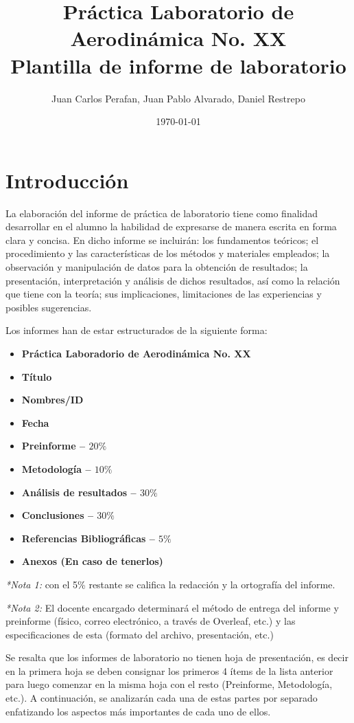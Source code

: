 \documentclass[a4paper]{article}
\title{Práctica Laboratorio de Aerodinámica No. XX \\
Plantilla de informe de laboratorio}
\author{Juan Carlos Perafan, Juan Pablo Alvarado, Daniel Restrepo}
\date{\today}
\begin{document}
\maketitle

\section{Introducción}

La elaboración del informe de práctica de laboratorio tiene como finalidad desarrollar en el alumno la habilidad de expresarse de manera escrita en forma clara y concisa. En dicho informe se incluirán: los fundamentos teóricos; el procedimiento y las características de los métodos y materiales empleados; la observación y manipulación de datos para la obtención de resultados; la presentación, interpretación y análisis de dichos resultados, así como la relación que tiene con la teoría; sus implicaciones, limitaciones de las experiencias y posibles sugerencias.

Los informes han de estar estructurados de la siguiente forma:

\begin{itemize}
\item \textbf{Práctica Laboradorio de Aerodinámica No. XX}
\item \textbf{Título}
\item \textbf{Nombres/ID}
\item \textbf{Fecha}
\item \textbf{Preinforme – $20\%$}
\item \textbf{Metodología – $10\%$}
\item \textbf{Análisis de resultados – $30\%$}
\item \textbf{Conclusiones – $30\%$}
\item \textbf{Referencias Bibliográficas – $5\%$}
\item \textbf{Anexos (En caso de tenerlos)}
\end{itemize}

\textit{*Nota 1:} con el 5\% restante se califica la redacción y la ortografía del informe.

\textit{*Nota 2:} El docente encargado determinará el método de entrega del informe y preinforme (físico, correo electrónico, a través de Overleaf, etc.) y las especificaciones de esta (formato del archivo, presentación, etc.)

Se resalta que los informes de laboratorio no tienen hoja de presentación, es decir en la primera hoja se deben consignar los primeros 4 ítems de la lista anterior para luego comenzar en la misma hoja con el resto (Preinforme, Metodología, etc.). A continuación, se analizarán cada una de estas partes por separado enfatizando los aspectos más importantes de cada uno de ellos.
\end{document}
